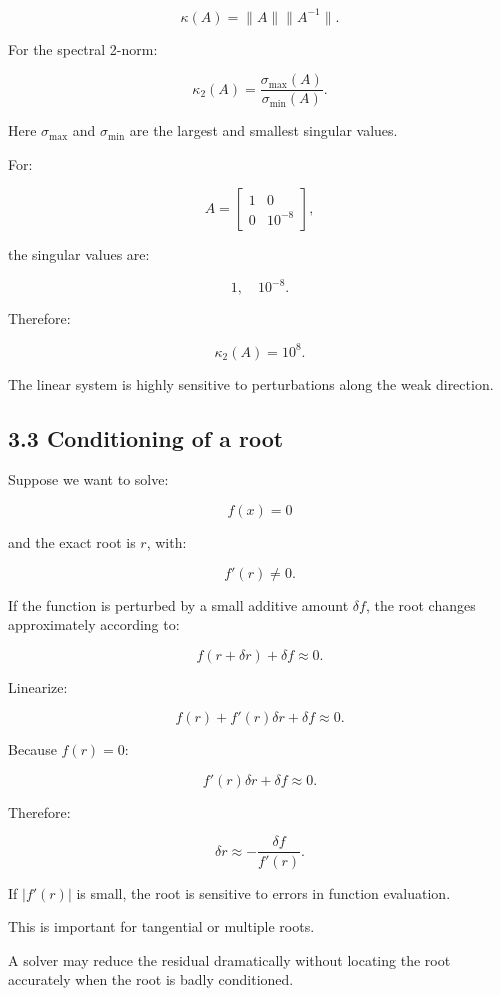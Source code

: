 \[ \boxed{ \kappa(A)=\|A\|\|A^{-1}\| }. \]

For the spectral 2-norm:

\[ \boxed{ \kappa_2(A) = \frac{\sigma_{\max}(A)}{\sigma_{\min}(A)} }. \]

Here \(\sigma_{\max}\) and \(\sigma_{\min}\) are the largest and smallest singular values.

For:

\[ A= \begin{bmatrix} 1&0\\ 0&10^{-8} \end{bmatrix}, \]

the singular values are:

\[ 1,\quad10^{-8}. \]

Therefore:

\[ \boxed{\kappa_2(A)=10^8}. \]

The linear system is highly sensitive to perturbations along the weak direction.

\subsection{3.3 Conditioning of a root}\label{02-foundations-ii-ch028-conditioning-of-a-root}

Suppose we want to solve:

\[ f(x)=0 \]

and the exact root is \(r\), with:

\[ f'(r)\ne0. \]

If the function is perturbed by a small additive amount \(\delta f\), the root changes approximately according to:

\[ f(r+\delta r)+\delta f\approx0. \]

Linearize:

\[ f(r)+f'(r)\delta r+\delta f\approx0. \]

Because \(f(r)=0\):

\[ f'(r)\delta r+\delta f\approx0. \]

Therefore:

\[ \boxed{ \delta r\approx-\frac{\delta f}{f'(r)} }. \]

If \(|f'(r)|\) is small, the root is sensitive to errors in function evaluation.

This is important for tangential or multiple roots.

A solver may reduce the residual dramatically without locating the root accurately when the root is badly conditioned.

